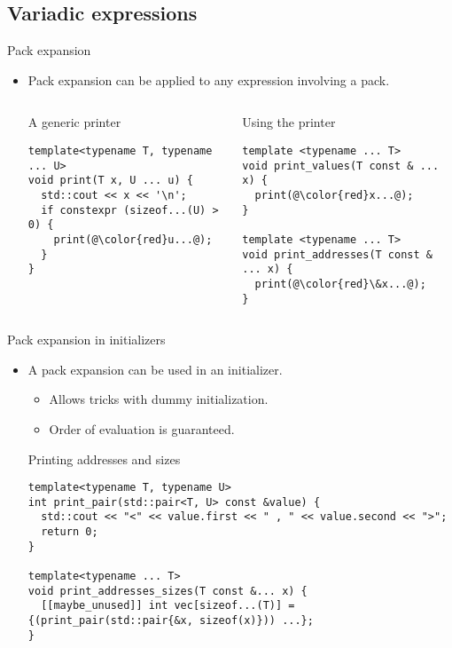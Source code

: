 \subsection{Variadic expressions}

\begin{frame}[t,fragile]{Pack expansion}
\begin{itemize}
  \item Pack expansion can be applied to any expression involving a pack.

\begin{columns}[T]

\begin{block}{A generic printer}
\begin{lstlisting}[escapechar=@]
template<typename T, typename ... U>
void print(T x, U ... u) {
  std::cout << x << '\n';
  if constexpr (sizeof...(U) > 0) {
    print(@\color{red}u...@);
  }
}
\end{lstlisting}
\end{block}

\begin{block}{Using the printer}
\begin{lstlisting}[escapechar=@]
template <typename ... T>
void print_values(T const & ... x) {
  print(@\color{red}x...@);
}

template <typename ... T>
void print_addresses(T const & ... x) {
  print(@\color{red}\&x...@);
}
\end{lstlisting}
\end{block}

\end{columns}

\end{itemize}
\end{frame}

\begin{frame}[t,fragile]{Pack expansion in initializers}
\begin{itemize}
  \item A pack expansion can be used in an initializer.
    \begin{itemize}
      \item Allows tricks with dummy initialization.
      \item Order of evaluation is guaranteed.
    \end{itemize}

\begin{block}{Printing addresses and sizes}
\begin{lstlisting}
template<typename T, typename U>
int print_pair(std::pair<T, U> const &value) {
  std::cout << "<" << value.first << " , " << value.second << ">";
  return 0;
}

template<typename ... T>
void print_addresses_sizes(T const &... x) {
  [[maybe_unused]] int vec[sizeof...(T)] = {(print_pair(std::pair{&x, sizeof(x)})) ...};
}

\end{lstlisting}
\end{block}
\end{itemize}
\end{frame}

